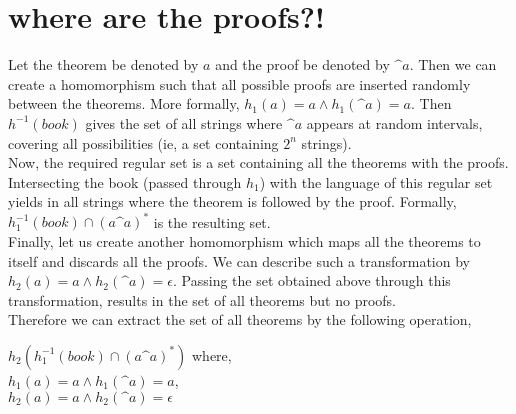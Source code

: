 \documentclass[11pt,letterpaper]{article}
\begin{document}
\section{where are the proofs?!}
Let the theorem be denoted by $a$ and the proof be denoted by $\^{a}$. Then we can create a homomorphism such that all possible proofs are inserted randomly between the theorems. More formally, $h_1(a) = a \wedge h_1(\^{a}) = a$. Then $h^{-1}(book)$ gives the set of all strings where $\^{a}$ appears at random intervals, covering all possibilities (ie, a set containing $2^n$ strings). \\
Now, the required regular set is a set containing all the theorems with the proofs. Intersecting the book (passed through $h_1$) with the language of this regular set yields in all strings where the theorem is followed by the proof. Formally, $h_1^{-1}(book) \cap (a\^{a})^*$ is the resulting set. \\
Finally, let us create another homomorphism which maps all the theorems to itself and discards all the proofs. We can describe such a transformation by $h_2(a) = a \wedge h_2(\^{a}) = \epsilon$. Passing the set obtained above through this transformation, results in the set of all theorems but no proofs. \\
Therefore we can extract the set of all theorems by the following operation,
\begin{center}
    $h_2(h_1^{-1}(book) \cap (a\^{a})^*)$ where, \\
    $h_1(a) = a \wedge h_1(\^{a}) = a$, \\
    $h_2(a) = a \wedge h_2(\^{a}) = \epsilon$
\end{center}
\end{document}
